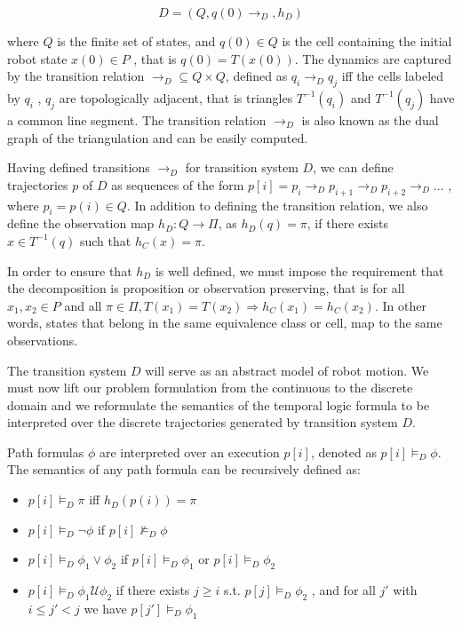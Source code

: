 \documentclass[conference,12pt]{IEEEtran}
\begin{document}
\begin{equation}
D = (Q,q(0) \rightarrow_D,h_D)
\end{equation}

where $Q$ is the finite set of states, and $q(0) \in Q$ is the cell containing the initial robot state $x(0) \in P$ , that is $q(0) = T(x(0))$. The dynamics are captured by the transition relation $\rightarrow_D \subseteq Q \times Q$, defined as $q_i \rightarrow_D q_j $ iff the cells labeled by $q_i$ , $q_j$ are topologically adjacent, that is triangles $T^{-1}(q_i)$ and $T^{-1}(q_j)$ have a common line segment. The transition relation $\rightarrow_D$ is also known as the dual graph of the triangulation and can be easily computed.

Having defined transitions $\rightarrow_D$ for transition system $D$, we can define trajectories $p$ of $D$ as sequences of the form $p[i] = p _i \rightarrow_D p_{i+1} \rightarrow_D p_{i+2} \rightarrow_D . . .$ , where $p_i = p(i) \in Q$. In addition to defining the transition relation, we also define the observation map $h_D : Q \rightarrow \Pi$, as $h_D(q) = \pi$, if there exists $x \in T^{-1}(q)$ such that $h_C(x) = \pi$.

In order to ensure that $h_D$ is well defined, we must impose the requirement that the decomposition is proposition or observation preserving, that is for all $x_1 , x_2 \in P$ and all $\pi \in \Pi, T(x _1) = T(x_2) \Rightarrow h_C(x_1 ) = h_C(x_2)$. In other words, states that belong in the same equivalence class or cell, map to the same observations.

The transition system $D$ will serve as an abstract model of robot motion. We must now lift our problem formulation from the continuous to the discrete domain and we reformulate the semantics of the temporal logic formula to be interpreted over the discrete trajectories generated by transition system $D$.

Path formulas $\phi$ are interpreted over an execution $p[i]$, denoted as $p[i] \models_D \phi$. The semantics of any path formula can be recursively defined as:

\begin{itemize}
\item $p[i] \models_D \pi$ iff $h_D(p(i)) = \pi$
\item $p[i] \models_D \neg \phi$ if $p[i] \nvDash_D \phi$
\item $p[i] \models_D \phi_1 \vee \phi_2$ if $p[i]  \models_D \phi_1$ or $p[i] \models_D \phi_2$
\item $p[i] \models_D \phi_1 \mathcal{U} \phi_2$ if there exists $j \geq i$ s.t. $p[j] \models_D \phi_2$ , and for all $j'$ with $i \leq j' < j $ we have $p[j'] \models_D \phi_1$
\end{itemize}
\end{document}
